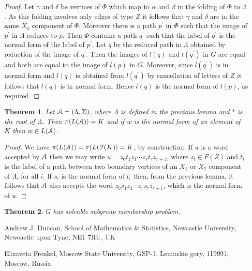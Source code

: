\documentclass[a4paper,12pt]{article}
\renewcommand{\a}{\alpha }
\renewcommand{\b}{\beta }
\newcommand{\g}{\gamma }
\renewcommand{\d}{\delta }
\renewcommand{\L}{\Lambda }
\renewcommand{\S}{\Sigma }
\newcommand{\cA}{{\cal{A}}}
\newcommand{\cF}{{\cal{F}}}
\newtheorem{theorem}{Theorem}[section]
\numberwithin{equation}{section}
\numberwithin{figure}{section}
\renewcommand{\cF}{\mathcal{F}}
\begin{document}
\begin{proof}
Let $\g$ and $\d$ be vertices of $\Phi$ which map to $\a$ and $\b$ in the
folding of $\Phi$ to $\L$. As this folding involves only edges of type $Z$
it follows that $\g$ and $\d$ are in the same $X_k$ component of $\Phi$.
Moreover there is a path $p^\prime$ in $\Phi$ such that the image
of $p^\prime$ in $\L$ reduces to $p$. Then $\Phi$ contains a path
$q^\prime$ such that the label of $q^\prime$ is the normal form of
the label of $p^\prime$. Let $q$ be the reduced path in $\L$ obtained by
reduction of the image of $q^\prime$. Then the images of $l(q)$ and
$l(q^\prime)$ in $G$ are equal and both are equal to the image of $l(p)$ in
$G$. Moreover, since $l(q^\prime)$ is in normal form and $l(q)$ is obtained
from $l(q^\prime)$ by cancellation of letters of $Z$ it follows that
$l(q)$ is in normal form. Hence $l(q)$ is the normal form of $l(p)$,
as required.
\end{proof}
\begin{theorem}
Let $\cA=(\L,\S)$, where $\L$ is defined in the previous
lemma and $\ast$ is the root of $\L$. Then $\pi(L(\cA))=K$ and if $w$ is the normal form of an element
of $K$ then $w\in L(\cA)$.
\end{theorem}
\begin{proof}
We have $\pi(L(\cA))=\pi(L(\cF(K))=K$, by construction. If $u$ is a word
accepted by $\cA$ then we may write $u=z_0t_1z_1\cdots z_rt_rz_{r+1}$, where
$z_i\in F(Z)$ and $t_i$ is the label of a path between two boundary
vertices of an $X_1$ or $X_2$ component of $\L$, for all $i$. If
$s_i$ is the normal form of $t_i$ then, from the previous lemma, it follows
that $\cA$ also accepts the word $z_0s_1z_1\cdots z_rs_rz_{r+1}$, which
is the normal form of $u$.
\end{proof}
\begin{theorem}
$G$ has solvable subgroup membership problem.
\end{theorem}



\medskip



\noindent \textsf{Andrew J. Duncan, School of Mathematics \&
Statistics, Newcastle University, Newcastle upon Tyne, NE1 7RU,
UK}



\noindent \textsf{Elizaveta Frenkel, Moscow State University,
GSP-1, Leninskie gory, 119991, Moscow, Russia}

\end{document}
